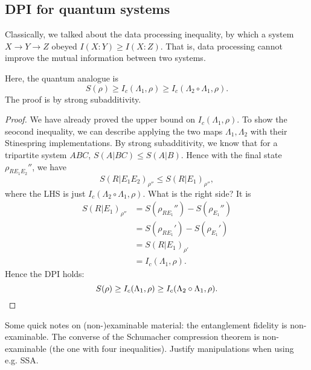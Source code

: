 

\subsection*{DPI for quantum systems}
Classically, we talked about the data processing inequality, by which a system $X\to Y\to Z$ obeyed $I(X:Y)\geq I(X:Z)$. That is, data processing cannot improve the mutual information between two systems.

Here, the quantum analogue is
\begin{equation}
    S(\rho)\geq I_c(\Lambda_1,\rho) \geq I_c(\Lambda_2 \circ \Lambda_1,\rho).
\end{equation}
The proof is by strong subadditivity.
\begin{proof}
    We have already proved the upper bound on $I_c(\Lambda_1,\rho)$. To show the seocond inequality, we can describe applying the two maps $\Lambda_1,\Lambda_2$ with their Stinespring implementations. By strong subadditivity, we know that for a tripartite system $ABC$, $S(A|BC)\leq S(A|B)$. Hence with the final state $\rho_{RE_1E_2}''$, we have
    \begin{equation}
        S(R|E_1E_2)_{\rho''}\leq S(R|E_1)_{\rho''},
    \end{equation}
    where the LHS is just $I_c(\Lambda_2 \circ \Lambda_1, \rho)$. What is the right side? It is
    \begin{align*}
        S(R|E_1)_{\rho''} &= S(\rho_{RE_1}'') -S(\rho_{E_1}'')\\
            &=S(\rho_{RE_1}')-S(\rho_{E_1}')\\
            &=S(R|E_1)_{\rho'}\\
            &= I_c(\Lambda_1,\rho).
    \end{align*}
    Hence the DPI holds:
    \begin{equation}
        S(\rho) \geq I_c(\Lambda_1,\rho) \geq I_c(\Lambda_2 \circ \Lambda_1,\rho).\qedhere
    \end{equation}
\end{proof}
\begin{note}
Some quick notes on (non-)examinable material: the entanglement fidelity is non-examinable. The converse of the Schumacher compression theorem is non-examinable (the one with four inequalities). Justify manipulations when using e.g. SSA.
\end{note}